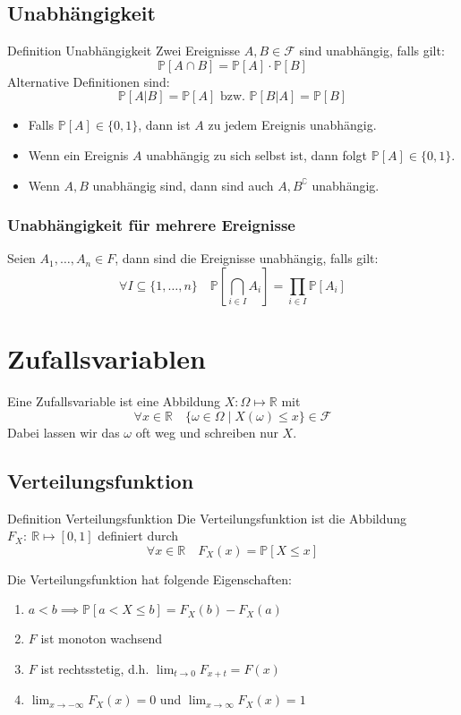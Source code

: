 \documentclass[a4paper,10pt]{article}
\def\R{\mathbb{R}}
\def\P{\mathbb{P}}
\def\F{\mathcal{F}}
\begin{document}
\subsection{Unabhängigkeit}
\begin{mainbox}{Definition Unabhängigkeit}
	Zwei Ereignisse \(A, B\in \F\) sind unabhängig, falls gilt:
	\[\P[A\cap B] = \P[A] \cdot \P[B]\]
	Alternative Definitionen sind:
	\[\P[A|B] = \P[A] \text{ bzw. } \P[B|A] = \P[B]\]
\end{mainbox}
\begin{itemize}
	\item Falls \(\P[A] \in \{0,1\}\), dann ist \(A\) zu jedem Ereignis unabhängig.
	\item Wenn ein Ereignis \(A\) unabhängig zu sich selbst ist, dann folgt \(\P[A] \in \{0,1\}\).
	\item Wenn \(A, B\) unabhängig sind, dann sind auch \(A, B^\complement\) unabhängig.
\end{itemize}
\subsubsection*{Unabhängigkeit für mehrere Ereignisse}
Seien \(A_1, \ldots, A_n \in F\), dann sind die Ereignisse unabhängig, falls gilt:
\[\forall I \subseteq \{1, \ldots, n\} \quad \P[\bigcap_{i\in I}A_i] = \prod_{i\in I} \P[A_i]\]

\section{Zufallsvariablen}
Eine Zufallsvariable ist eine Abbildung \(X: \Omega \mapsto \R\) mit
\[\forall x \in \R \quad \{\omega \in \Omega \mid X(\omega) \leq x\} \in \F\]
Dabei lassen wir das \(\omega\) oft weg und schreiben nur \(X\).

\subsection{Verteilungsfunktion}
\begin{mainbox}{Definition Verteilungsfunktion}
	Die Verteilungsfunktion ist die Abbildung \(F_X: \ \R \mapsto [0,1]\) definiert durch
	\[\forall x \in \R \quad F_X(x) = \P[X \le x]\]
\end{mainbox}
Die Verteilungsfunktion hat folgende Eigenschaften:
\begin{enumerate}
	\item \(a < b \implies \P[a < X \le b] = F_X(b) - F_X(a)\)
	\item \(F\) ist monoton wachsend
	\item \(F\) ist rechtsstetig, d.h. \(\lim_{t \to 0} F_{x+t} = F(x)\)
	\item \(\lim_{x\to - \infty} F_X(x) = 0\) und \(\lim_{x\to \infty} F_X(x) = 1\)
\end{enumerate}
\end{document}

